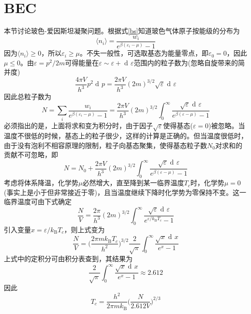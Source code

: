 \documentclass[UTF8,oneside,openany]{ctexbook}
\DeclareMathOperator\dif{d\!}
\newcommand\aver[1]{\langle#1\rangle}
\newcommand\kb{k_{\text{B}}}
\begin{document}
\section{BEC}
本节讨论玻色-爱因斯坦凝聚问题。根据式\ref{bs}知道玻色气体原子按能级的分布为
\begin{equation}
\aver{n_i}=\frac{w_i}{e^{\beta(\varepsilon_i-\mu)}-1}
\end{equation}
因为$\aver{n_i}\ge0$，所以$\varepsilon_i\ge\mu$。不失一般性，可选取基态为能量零点，即$\varepsilon_0=0$，因此$\mu\le0$。由$\varepsilon=p^2/2m$可得能量在$\varepsilon\sim\varepsilon+\dif\varepsilon$范围内的粒子数为(忽略自旋带来的简并度)
\begin{equation}
\frac{4\pi V}{h^3}p^2\dif p=\frac{2\pi V}{h^3}(2m)^{3/2}\sqrt{\varepsilon}\dif\varepsilon
\end{equation}
因此总粒子数为
\begin{equation}
N=\sum_{i}\frac{w_i}{e^{\beta(\varepsilon_i-\mu)}-1}=\frac{2\pi V}{h^3}(2m)^{3/2}\int_{0}^{\infty}\frac{\sqrt{\varepsilon}\dif\varepsilon}{e^{\beta(\varepsilon-\mu)}-1}
\end{equation}
必须指出的是，上面将求和变为积分时，由于因子$\sqrt{\varepsilon}$使得基态($\varepsilon=0$)被忽略。当温度不很低的时候，基态上的粒子很少，这样的计算是正确的。但当温度很低时，由于没有泡利不相容原理的限制，粒子向基态聚集，使得基态粒子数$N_0$对求和的贡献不可忽略，即
\begin{equation}\label{nanding}
N=N_0+\frac{2\pi V}{h^3}(2m)^{3/2}\int_{0}^{\infty}\frac{\sqrt{\varepsilon}\dif\varepsilon}{e^{\beta(\varepsilon-\mu)}-1}
\end{equation}
考虑将体系降温，化学势$\mu$必然增大，直至降到某一临界温度$T_c$时，化学势$\mu=0$(事实上是小于但非常接近于零)，且当温度继续下降时化学势为零保持不变。这一临界温度可由下式确定
\begin{equation}
\frac{N}{V}=\frac{2\pi}{h^3}(2m)^{3/2}\int_{0}^{\infty}\frac{\sqrt{\varepsilon}\dif\varepsilon}{e^{\varepsilon/\kb T_c}-1}
\end{equation}
引入变量$x=\varepsilon/\kb T_c$，则上式变为
\begin{equation}
\frac{N}{V}=\biggl(\frac{2\pi m\kb T_c}{h^2}\biggr)^{3/2}\frac{2}{\sqrt{\pi}}\int_{0}^{\infty}\frac{\sqrt{x}\dif x}{e^x-1}
\end{equation}
上式中的定积分可由积分表查到，其结果为
\begin{equation}
\frac{2}{\sqrt{\pi}}\int_{0}^{\infty}\frac{\sqrt{x}\dif x}{e^x-1}\approx2.612
\end{equation}
因此
\begin{equation}\label{tc}
T_c=\frac{h^2}{2\pi m\kb}\biggl(\frac{N}{2.612V}\biggr)^{2/3}
\end{equation}
\end{document}
